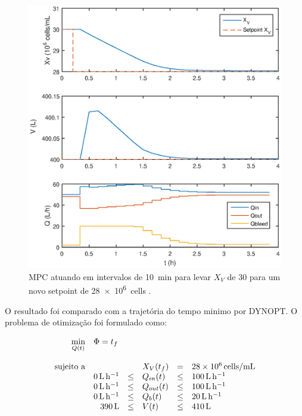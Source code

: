 \documentclass[fleqn,10pt]{SelfArx} %
\begin{document}
\begin{figure}[ht]\centering
	\includegraphics[width=\linewidth]{MPC2}
	\caption{MPC atuando em intervalos de \SI{10}{\minute} para levar $X_V$ de 30 para um novo setpoint de \SI{28e6}{cells \per\mL.}}
	\label{fig:MPC2}
\end{figure}

O resultado foi comparado com a trajetória do tempo minimo por DYNOPT. O problema de otimização foi formulado como:

\begin{equation} \label{eq:otim4}
\begin{array}{rrclcl}
\displaystyle \min_{Q(t)} & \multicolumn{3}{l}{\Phi = t_{f}} \\
& & & \\
\textrm{sujeito a} &&& X_V(t_{f}) & = & \SI{28e6}{cells \per\mL} \\
& \SI{0}{ \L\per\hour} & \leq & Q_{in}(t) & \leq &\SI{100}{ \L\per\hour}\\
& \SI{0}{ \L\per\hour} & \leq & Q_{out}(t) & \leq&\SI{100}{ \L\per\hour}\\
& \SI{0}{ \L\per\hour} & \leq & Q_{b}(t) & \leq &\SI{20}{ \L\per\hour}\\
& \SI{390}{ \L} & \leq & V(t) & \leq &\SI{410}{ \L}
\end{array}
\end{equation}
\end{document}
